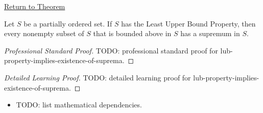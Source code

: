 \newpage
{}
\label{prf:lub-property-implies-existence-of-suprema}

\begin{remark*}[Return]
\hyperref[thm:lub-property-implies-existence-of-suprema]{Return to Theorem}
\end{remark*}

\begin{theorem*}
Let $S$ be a partially ordered set. If $S$ has the Least Upper Bound Property, then every nonempty subset of $S$ that is bounded above in $S$ has a supremum in $S$.
\end{theorem*}

\begin{proof}[Professional Standard Proof]
\LRAProofBodyStart
TODO: professional standard proof for lub-property-implies-existence-of-suprema.
\end{proof}

\begin{proof}[Detailed Learning Proof]
\LRAProofBodyStart
TODO: detailed learning proof for lub-property-implies-existence-of-suprema.
\end{proof}

\begin{remark*}
\end{remark*}

\begin{dependencies}
\begin{itemize}
  \item TODO: list mathematical dependencies.
\end{itemize}
\end{dependencies}

\clearpage
